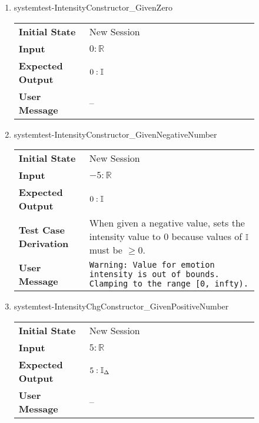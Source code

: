 \begin{enumerate}
    \item{systemtest-IntensityConstructor\_GivenZero}
    \begin{table}[H]
        \centering
        \begin{tabular}{P{0.25\linewidth}P{0.6\linewidth}}
            \toprule
            \textbf{Initial State} & New Session \\
            \textbf{Input} & $0 : \mathbb{R}$ \\ \midrule
            \textbf{Expected Output} & $0 : \mathbb{I}$ \\
            \textbf{User Message} & -- \\ \bottomrule
        \end{tabular}
    \end{table}

    \item{systemtest-IntensityConstructor\_GivenNegativeNumber}
    \begin{table}[H]
        \centering
        \begin{tabular}{P{0.25\linewidth}P{0.6\linewidth}}
            \toprule
            \textbf{Initial State} & New Session \\
            \textbf{Input} & $-5 : \mathbb{R}$ \\ \midrule
            \textbf{Expected Output} & $0 : \mathbb{I}$ \\
            \textbf{Test Case Derivation} & When given a negative value,
            \progname{} sets the intensity value to $0$ because values of
            $\mathbb{I}$ must be $\geq 0$.\\
            \textbf{User Message} & \texttt{Warning: Value for emotion
            intensity is out of bounds. Clamping to the range [0, infty).} \\
            \bottomrule
        \end{tabular}
    \end{table}

    \item{systemtest-IntensityChgConstructor\_GivenPositiveNumber}
    \begin{table}[H]
        \centering
        \begin{tabular}{P{0.25\linewidth}P{0.6\linewidth}}
            \toprule
            \textbf{Initial State} & New Session \\
            \textbf{Input} & $5 : \mathbb{R}$ \\ \midrule
            \textbf{Expected Output} & $5 : \mathbb{I}_{\Delta}$ \\
            \textbf{User Message} & -- \\ \bottomrule
        \end{tabular}
    \end{table}


\end{enumerate}
